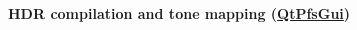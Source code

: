 \documentclass[12pt,a4paper,oneside,openright]{book}
\newcommand{\farr}{\ding{231}} %
\begin{document}
\begin{CJK}{UTF8}{}
\begin{figure}[htbp]
\begin{center}
\begin{minipage}[c]{.288\textwidth}
\begin{center}
        \\
      \end{center}
    \end{minipage}
    \begin{minipage}[c]{12pt}
      \huge\farr
    \end{minipage}
    \begin{minipage}[c]{.33\textwidth}
      \begin{center}
        \textbf{\acs{HDR} compilation and tone mapping (\href{http://qtpfsgui.sourceforge.net/}{QtPfsGui})}\\

\end{center}
\end{minipage}
\end{center}
\end{figure}
\end{CJK}
\end{document}
